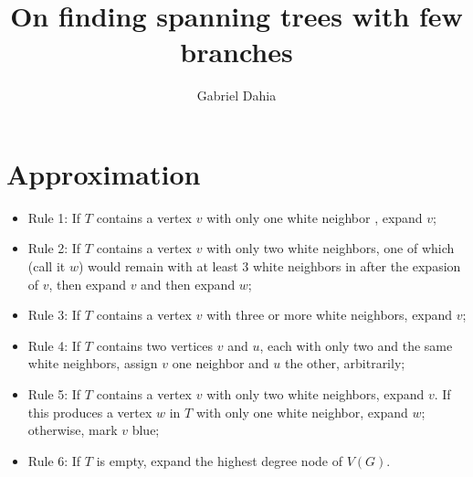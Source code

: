 \documentclass[12pt]{article}
\title{On finding spanning trees with few branches}
\author{Gabriel Dahia\inst{1}}
\begin{document}
 

\maketitle

\section{Approximation}

\begin{itemize}
  \item Rule 1: If $T$ contains a vertex $v$ with only one white neighbor , expand $v$;
  \item Rule 2: If $T$ contains a vertex $v$ with only two white neighbors, one of which (call it $w$) would remain with at least 3 white neighbors in after the expasion of $v$, then expand $v$ and then expand $w$;
  \item Rule 3: If $T$ contains a vertex $v$ with three or more white neighbors, expand $v$;
  \item Rule 4: If $T$ contains two vertices $v$ and $u$, each with only two and the same white neighbors, assign $v$ one neighbor and $u$ the other, arbitrarily;
  \item Rule 5: If $T$ contains a vertex $v$ with only two white neighbors, expand $v$.
    If this produces a vertex $w$ in $T$ with only one white neighbor, expand $w$; otherwise, mark $v$ blue;
  \item Rule 6: If $T$ is empty, expand the highest degree node of $V(G)$.
\end{itemize}
\end{document}
